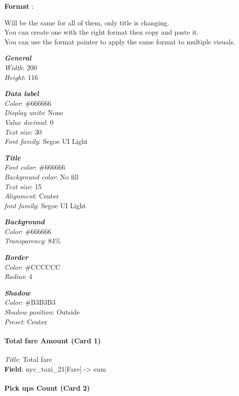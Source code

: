 \documentclass[
]{book}
\begin{document}
\textbf{Format} :

Will be the same for all of them, only title is changing.\\
You can create one with the right format then copy and paste it.\\
You can use the format painter to apply the same format to multiple visuals.

\textbf{\emph{General}}\\
\emph{Width}: 200\\
\emph{Height}: 116

\textbf{\emph{Data label}}\\
\emph{Color}: \#666666\\
\emph{Display units}: None\\
\emph{Value decimal}: 0\\
\emph{Text size}: 30\\
\emph{Font family}: Segoe UI Light

\textbf{\emph{Title}}\\
\emph{Font color}: \#666666\\
\emph{Background color}: No fill\\
\emph{Text size}: 15\\
\emph{Alignment}: Center\\
\emph{font family}: Segoe UI Light

\textbf{\emph{Background}}\\
\emph{Color}: \#666666\\
\emph{Transparency}: 84\%

\textbf{\emph{Border}}\\
\emph{Color}: \#CCCCCC\\
\emph{Radius}: 4

\textbf{\emph{Shadow}}\\
\emph{Color}: \#B3B3B3\\
\emph{Shadow position}: Outside\\
\emph{Preset}: Center

\hypertarget{total-fare-amount-card-1}{%
\paragraph{Total fare Amount (Card 1)}\label{total-fare-amount-card-1}}

\emph{Title}: Total fare\\
\textbf{Field}: nyc\_taxi\_21{[}Fare{]} -\textgreater{} sum

\hypertarget{pick-ups-count-card-2}{%
\paragraph{Pick ups Count (Card 2)}\label{pick-ups-count-card-2}}
\end{document}
